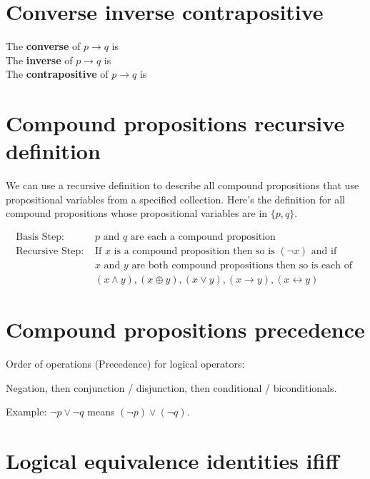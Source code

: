 \documentclass[12pt, oneside]{article}
\begin{document}
\section*{Converse inverse contrapositive}


The {\bf converse}  of $p \to q$ is \underline{}\\

The {\bf inverse}  of $p \to q$ is \underline{}\\

The {\bf contrapositive}  of $p \to q$ is \underline{} \\
 \vfill
\section*{Compound propositions recursive definition}


We can use a recursive definition to describe all 
compound propositions that use propositional variables 
from a specified collection.  Here's the definition
for all compound propositions whose propositional variables 
are in $\{p, q\}$.

\[
\begin{array}{ll}
\textrm{Basis Step: } & p \textrm{ and } q \textrm{ are each a compound proposition} \\
\textrm{Recursive Step: } & \textrm{If } x \textrm{ is a compound proposition then so is } (\lnot x) 
\textrm{ and if } \\
& x \textrm{ and } y \textrm{ are both compound propositions then so is each of }\\
&(x \land y), (x \oplus y), (x \lor y), (x \to y), (x \leftrightarrow y)
\end{array}
\] \vfill
\section*{Compound propositions precedence}


Order of operations (Precedence) for logical operators: 

Negation, then conjunction / disjunction, then conditional / biconditionals.

Example: $\lnot p \lor \lnot q$ means $(\lnot p) \lor (\lnot q)$.
 \vfill
\section*{Logical equivalence identities ififf}
\end{document}
